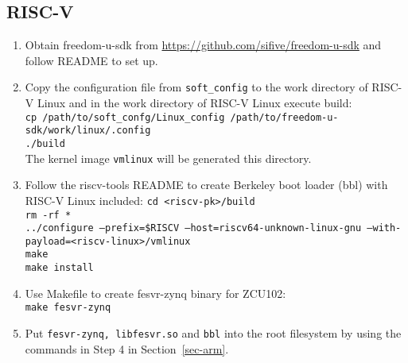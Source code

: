 \documentclass[a4paper,11pt]{article}
\begin{document}
\subsection{RISC-V}
\begin{enumerate}
\item Obtain freedom-u-sdk from \url{https://github.com/sifive/freedom-u-sdk} and follow README to set up.

\item Copy the configuration file from {\tt soft\_config} to the work directory of RISC-V Linux and in the work directory of RISC-V Linux execute build:\\
{\tt cp /path/to/soft\_confg/Linux\_config /path/to/freedom-u-sdk/work/linux/.config}\\
{\tt ./build}\\
The kernel image {\tt vmlinux} will be generated this directory.

\item Follow the riscv-tools README to create Berkeley boot loader (bbl) with RISC-V Linux included:
{\tt cd <riscv-pk>/build\\
rm -rf *\\
../configure --prefix=\$RISCV --host=riscv64-unknown-linux-gnu --with-payload=<riscv-linux>/vmlinux\\
make\\
make install}

\item Use Makefile to create fesvr-zynq binary for ZCU102:\\
{\tt make fesvr-zynq}

\item Put {\tt fesvr-zynq, libfesvr.so} and {\tt bbl} into the root filesystem by using the commands in Step 4 in Section~\ref{sec-arm}.
\end{enumerate}
\end{document}
